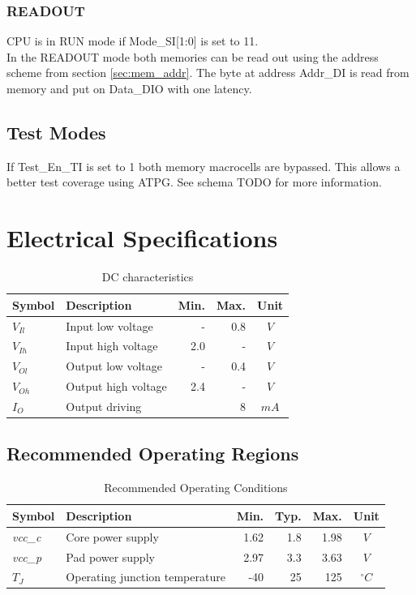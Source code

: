 \subsubsection{READOUT}
CPU is in RUN mode if Mode\_SI[1:0] is set to 11.\\
In the READOUT mode both memories can be read out using the address scheme from section \ref{sec:mem_addr}. The byte at address Addr\_DI is read from memory and put on Data\_DIO with one latency. 

\subsection{Test Modes}
If Test\_En\_TI is set to 1 both memory macrocells are bypassed. This allows a better test coverage using ATPG. See schema TODO for more information.


\section{Electrical Specifications}
\begin{table}[htbp]
 \caption{DC characteristics \cite{faraday}}
 \label{tab:elect_rec}
\centering\begin{tabular}{|l|l|r|r|c|} \hline
Symbol & Description & Min. & Max. & Unit \\ \hline
$V_{Il}$ & Input low voltage & - & 0.8 & $V$ \\ \hline
$V_{Ih}$ & Input high voltage & 2.0 & - & $V$ \\ \hline
$V_{Ol}$ & Output low voltage & - & 0.4 & $V$ \\ \hline
$V_{Oh}$ & Output high voltage & 2.4 & - & $V$ \\ \hline
$I_O$ & Output driving & \multicolumn{2}{r|}{8} & $mA$ \\ \hline

 \end{tabular}
\end{table}

\subsection{Recommended Operating Regions}
\begin{table}[htbp]
 \caption{Recommended Operating Conditions \cite{faraday}}
 \label{tab:elect_rec}
\centering\begin{tabular}{|l|l|r|r|r|c|} \hline
Symbol & Description & Min. & Typ. & Max. & Unit \\ \hline
\textit{vcc\_c} & Core power supply & 1.62 & 1.8 & 1.98 & $V$ \\ \hline
\textit{vcc\_p} & Pad power supply & 2.97 & 3.3 & 3.63 & $V$ \\ \hline
$T_J$ & Operating junction temperature & -40 & 25 & 125 & $^{\circ} C$ \\ \hline

 \end{tabular}
\end{table}

